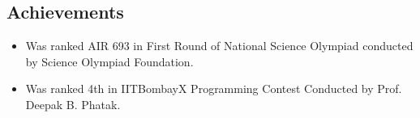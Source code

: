 \documentclass[12pt,margin, centered]{res}
\begin{document}
\begin{resume}
\section{Achievements}
\vspace{12mm}
\begin{itemize}[leftmargin=*]
 \item Was ranked AIR 693 in First Round of National Science Olympiad conducted by Science Olympiad Foundation.
 \item Was ranked 4th in IITBombayX Programming Contest Conducted by Prof. Deepak B. Phatak.
\end{itemize}


\end{resume}
\end{document}
